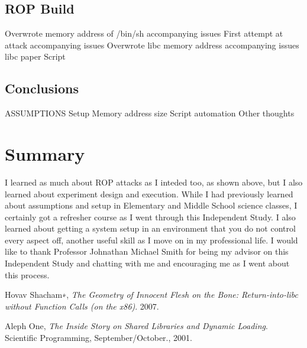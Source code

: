 \documentclass[11pt]{amsart}
\begin{document}
\subsection*{ROP Build}
Overwrote memory address of /bin/sh
	accompanying issues
First attempt at attack
	accompanying issues
Overwrote libc memory address
	accompanying issues
	libc paper
	Script
\subsection*{Conclusions}
ASSUMPTIONS
Setup
Memory address size
Script automation
Other thoughts
\section*{Summary}
I learned as much about ROP attacks as I inteded too, as shown above, but I also learned about experiment design and execution. While I had previously learned about assumptions and setup in Elementary and Middle School science classes, I certainly got a refresher course as I went through this Independent Study. I also learned about getting a system setup in an environment that you do not control every aspect off, another useful skill as I move on in my professional life.
I would like to thank Professor Johnathan Michael Smith for being my advisor on this Independent Study and chatting with me and encouraging me as I went about this process.

\begin{thebibliography}{1}

  Hovav Shacham∗,
  \emph{The Geometry of Innocent Flesh on the Bone: Return-into-libc without Function Calls (on the x86)}.
  2007.

  Aleph One,
  \emph{The Inside Story on Shared Libraries and Dynamic Loading}.
  Scientific Programming, September/October.,
  2001.

\end{thebibliography}
\end{document}
